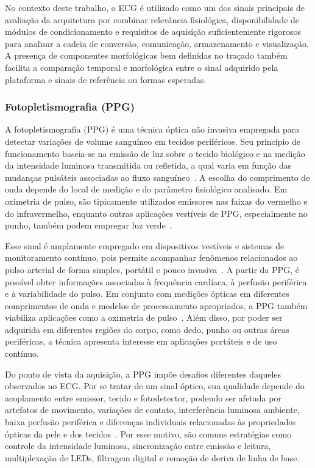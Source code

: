 \documentclass[a4paper,12pt]{fcte}
\begin{document}
No contexto deste trabalho, o ECG é utilizado como um dos sinais principais de avaliação da arquitetura por combinar relevância fisiológica, disponibilidade de módulos de condicionamento e requisitos de aquisição suficientemente rigorosos para analisar a cadeia de conversão, comunicação, armazenamento e visualização. A presença de componentes morfológicas bem definidas no traçado também facilita a comparação temporal e morfológica entre o sinal adquirido pela plataforma e sinais de referência ou formas esperadas.

\subsubsection{Fotopletismografia (PPG)}

A fotopletismografia (PPG) é uma técnica óptica não invasiva empregada para detectar variações de volume sanguíneo em tecidos periféricos. Seu princípio de funcionamento baseia-se na emissão de luz sobre o tecido biológico e na medição da intensidade luminosa transmitida ou refletida, a qual varia em função das mudanças pulsáteis associadas ao fluxo sanguíneo~\cite{allen2007ppg}. A escolha do comprimento de onda depende do local de medição e do parâmetro fisiológico analisado. Em oximetria de pulso, são tipicamente utilizados emissores nas faixas do vermelho e do infravermelho, enquanto outras aplicações vestíveis de PPG, especialmente no punho, também podem empregar luz verde~\cite{charlton2022wearable_ppg}.

Esse sinal é amplamente empregado em dispositivos vestíveis e sistemas de monitoramento contínuo, pois permite acompanhar fenômenos relacionados ao pulso arterial de forma simples, portátil e pouco invasiva~\cite{charlton2022wearable_ppg,huhn2022wearables_health_research}. A partir da PPG, é possível obter informações associadas à frequência cardíaca, à perfusão periférica e à variabilidade do pulso. Em conjunto com medições ópticas em diferentes comprimentos de onda e modelos de processamento apropriados, a PPG também viabiliza aplicações como a oximetria de pulso~\cite{charlton2022wearable_ppg}. Além disso, por poder ser adquirida em diferentes regiões do corpo, como dedo, punho ou outras áreas periféricas, a técnica apresenta interesse em aplicações portáteis e de uso contínuo.

Do ponto de vista da aquisição, a PPG impõe desafios diferentes daqueles observados no ECG. Por se tratar de um sinal óptico, sua qualidade depende do acoplamento entre emissor, tecido e fotodetector, podendo ser afetada por artefatos de movimento, variações de contato, interferência luminosa ambiente, baixa perfusão periférica e diferenças individuais relacionadas às propriedades ópticas da pele e dos tecidos~\cite{charlton2022wearable_ppg,ates2022wearable_sensors}. Por esse motivo, são comuns estratégias como controle da intensidade luminosa, sincronização entre emissão e leitura, multiplexação de LEDs, filtragem digital e remoção de deriva de linha de base.
\end{document}
